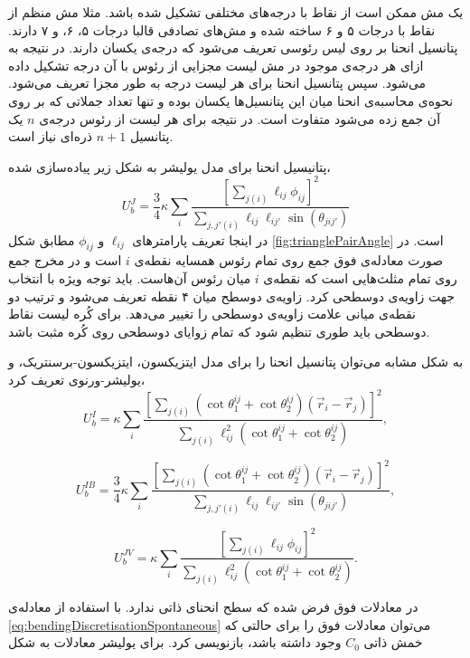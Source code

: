 یک مش ممکن است از نقاط با درجه‌های مختلفی تشکیل شده باشد. مثلا مش منظم از نقاط با درجات ۵ و ۶ ساخته شده و مش‌های تصادفی قالبا درجات ۵، ۶، و ۷ دارند. پتانسیل انحنا بر روی لیس رئوسی تعریف می‌شود که درجه‌ی یکسان دارند. در نتیجه به ازای هر درجه‌ی موجود در مش  لیست مجزایی از رئوس با آن درجه تشکیل داده می‌شود. سپس پتانسیل انحنا برای هر لیست درجه به طور مجزا تعریف می‌شود. نحوه‌ی محاسبه‌ی انحنا میان این پتانسیل‌ها یکسان بوده و تنها تعداد جملاتی که بر روی آن جمع زده می‌شود متفاوت است. در نتیجه برای هر لیست از رئوس درجه‌ی 
$n$
یک پتانسیل 
$n+1$
ذره‌ای نیاز است.


پتانیسیل  انحنا برای مدل یولیشر به شکل زیر پیاده‌سازی شده،
\begin{equation}
U_b^J=\frac{3}{4}\kappa\sum_i\frac{\left[\sum_{j(i)}\ell_{ij}\phi_{ij}\right]^2}{\sum_{j,j'(i)}\ell_{ij}\ell_{ij'}\sin(\theta_{jij'})}
\end{equation}
در اینجا تعریف پارامتر‌های 
$\ell_{ij}$
و
$\phi_{ij}$
مطابق شکل 
\ref{fig:trianglePairAngle}
است. در صورت معادله‌ی فوق جمع روی تمام رئوس همسایه نقطه‌ی 
$i$
است و در مخرج جمع روی تمام مثلث‌هایی است که نقطه‌ی 
$i$
میان رئوس آن‌هاست. باید توجه ویژه با انتخاب جهت زاویه‌ی دوسطحی کرد. زاویه‌ی دوسطح میان ۴ نقطه تعریف می‌شود و ترتیب دو نقطه‌ی میانی علامت زاویه‌ی دوسطحی را تغییر می‌دهد. برای کُره لیست نقاط دوسطحی باید طوری تنظیم شود که تمام زوایای دوسطحی روی کُره مثبت باشد.

به شکل مشابه می‌توان پتانسیل انحنا را برای مدل ایتزیکسون، ایتزیکسون-برسنتریک، و یولیشر-ورنوی تعریف کرد،
\begin{equation}
U_b^I=\kappa\sum_i\frac{\left[\sum_{j(i)}(\cot\theta_1^{ij}+\cot\theta_2^{ij})(\vec r_i-\vec r_j)\right]^2}{\sum_{j(i)}\ell_{ij}^2(\cot\theta_1^{ij}+\cot\theta_2^{ij})},
\end{equation}

\begin{equation}
U_b^{IB}=\frac{3}{4}\kappa\sum_i\frac{\left[\sum_{j(i)}(\cot\theta_1^{ij}+\cot\theta_2^{ij})(\vec r_i-\vec r_j)\right]^2}{\sum_{j,j'(i)}\ell_{ij}\ell_{ij'}\sin(\theta_{jij'})},
\end{equation}

\begin{equation}
U_b^{JV}=\kappa\sum_i\frac{\left[\sum_{j(i)}\ell_{ij}\phi_{ij}\right]^2}{\sum_{j(i)}\ell_{ij}^2(\cot\theta_1^{ij}+\cot\theta_2^{ij})}.
\end{equation}

در معادلات فوق فرض شده که سطح انحنای ذاتی ندارد. با استفاده از معادله‌ی 
\ref{eq:bendingDiscretisationSpontaneous}
می‌توان معادلات فوق را برای حالتی که خمش ذاتی 
$C_0$
وجود داشته باشد، بازنویسی کرد. برای یولیشر معادلات به شکل

